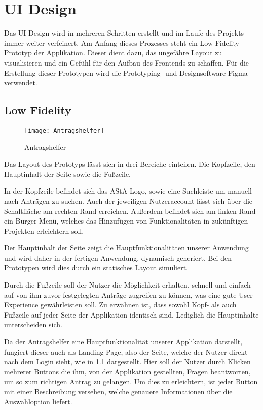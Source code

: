\chapter{UI Design}\label{ch:ui-design}
Das UI Design wird in mehreren Schritten erstellt und im Laufe des Projekts immer weiter
verfeinert. Am Anfang dieses Prozesses steht ein Low Fidelity Prototyp der Applikation.
Dieser dient dazu, das ungefähre Layout zu visualisieren und ein Gefühl für den Aufbau
des Frontends zu schaffen. Für die Erstellung dieser Prototypen wird die Prototyping- und
Designsoftware Figma verwendet.

\section{Low Fidelity}\label{Low Fidelity}
\begin{figure}[h]
  \centering
    \texttt{[image: Antragshelfer]}
    \caption{Antragshelfer}\label{Antragshelfer}
\end{figure}
Das Layout des Prototyps lässt sich in drei Bereiche einteilen. Die Kopfzeile, den
Hauptinhalt der Seite sowie die Fußzeile.

In der Kopfzeile befindet sich das \ac{AStA}-Logo, sowie eine Suchleiste um manuell nach
Anträgen zu suchen. Auch der jeweiligen Nutzeraccount lässt sich über die Schaltfläche
am rechten Rand erreichen. Außerdem befindet sich am linken Rand ein Burger Menü,
welches das Hinzufügen von Funktionalitäten in zukünftigen Projekten erleichtern soll.

Der Hauptinhalt der Seite zeigt die Hauptfunktionalitäten unserer Anwendung und wird 
daher in der fertigen Anwendung, dynamisch generiert. Bei den Prototypen wird dies
durch ein statisches Layout simuliert.

Durch die Fußzeile soll der Nutzer die Möglichkeit erhalten, schnell und einfach auf von
ihm zuvor festgelegten Anträge zugreifen zu können, was eine gute User Experience
gewährleisten soll. Zu erwähnen ist, dass sowohl Kopf- als auch Fußzeile auf jeder Seite
der Applikation identisch sind. Lediglich die Hauptinhalte unterscheiden sich.

Da der Antragshelfer eine Hauptfunktionalität unserer Applikation darstellt, fungiert
dieser auch als Landing-Page, also der Seite, welche der Nutzer direkt nach dem Login
sieht, wie in \ref{Antragshelfer} dargestellt. Hier soll der Nutzer durch Klicken mehrerer Buttons die
ihm, von der Applikation gestellten, Fragen beantworten, um so zum richtigen Antrag zu
gelangen. Um dies zu erleichtern, ist jeder Button mit einer Beschreibung versehen, welche genauere Informationen über die Auswahloption liefert.

